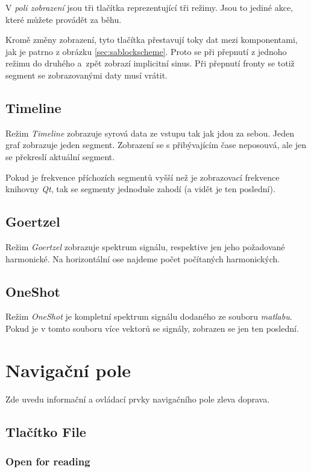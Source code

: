 V \emph{poli zobrazení} jsou tři tlačítka reprezentující tři režimy. Jsou to jediné akce, které můžete provádět za běhu.


Kromě změny zobrazení, tyto tlačítka přestavují toky dat mezi komponentami, jak je patrno z obrázku \ref{sec:sablockscheme}. Proto se při přepnutí z jednoho režimu do druhého a~zpět zobrazí implicitní sinus. Při přepnutí fronty se totiž segment se zobrazovanými daty musí vrátit.

\subsection{Timeline}

Režim \emph{Timeline} zobrazuje syrová data ze vstupu tak jak jdou za sebou. Jeden graf zobrazuje jeden segment. Zobrazení se s přibývajícím čase neposouvá, ale jen se překreslí aktuální segment.

Pokud je frekvence příchozích segmentů vyšší než je zobrazovací frekvence knihovny \emph{Qt}, tak se segmenty jednoduše zahodí (a vidět je ten poslední).

\subsection{Goertzel}

Režim \emph{Goertzel} zobrazuje spektrum signálu, respektive jen jeho požadované harmonické. Na horizontální ose najdeme počet počítaných harmonických.

\subsection{OneShot}

Režim \emph{OneShot} je kompletní spektrum signálu dodaného ze souboru \emph{matlabu}.
Pokud je v tomto souboru více vektorů se signály, zobrazen se jen ten poslední.

\section{Navigační pole}

Zde uvedu informační a ovládací prvky navigačního pole zleva doprava.

\subsection{Tlačítko File}

\subsubsection{Open for reading}

